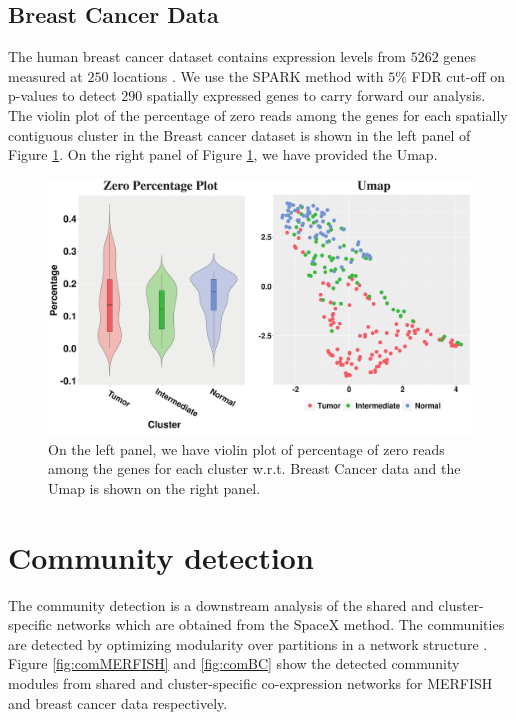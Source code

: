 \documentclass[
]{book}
\begin{document}
\hypertarget{breast-cancer-data}{%
\subsection{Breast Cancer Data}\label{breast-cancer-data}}

The human breast cancer dataset contains expression levels from \(5262\) genes measured at \(250\) locations \citep{staahl2016visualization}. We use the SPARK method with \(5\%\) FDR cut-off on p-values to detect \(290\) spatially expressed genes to carry forward our analysis. The violin plot of the percentage of zero reads among the genes for each spatially contiguous cluster in the Breast cancer dataset is shown in the left panel of Figure \ref{fig:BCperzero}. On the right panel of Figure \ref{fig:BCperzero}, we have provided the Umap.

\begin{figure}

{\centering \includegraphics[width=0.8\linewidth]{images/BC_zero_umap} 

}

\caption{On the left panel, we have violin plot of percentage of zero reads among the genes for each cluster w.r.t. Breast Cancer data and the Umap is shown on the right panel.}\label{fig:BCperzero}
\end{figure}

\hypertarget{communitydetection}{%
\section{Community detection}\label{communitydetection}}

The community detection is a downstream analysis of the shared and cluster-specific networks which are obtained from the SpaceX method. The communities are detected by optimizing modularity over partitions in a network structure \citep{brandes2007modularity}. Figure \ref{fig:comMERFISH} and \ref{fig:comBC} show the detected community modules from shared and cluster-specific co-expression networks for MERFISH and breast cancer data respectively.
\end{document}
